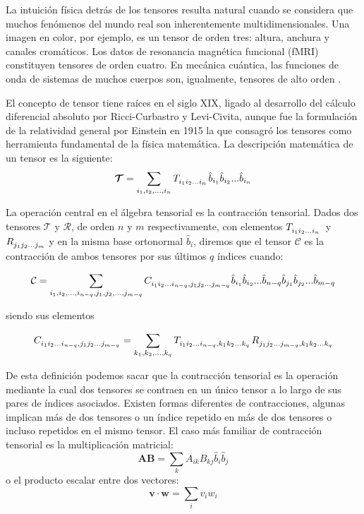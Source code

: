 La intuición física detrás de los tensores resulta natural cuando se considera que muchos fenómenos del mundo real son inherentemente multidimensionales. Una imagen en color, por ejemplo, es un tensor de orden tres: altura, anchura y canales cromáticos. Los datos de resonancia magnética funcional (fMRI) constituyen tensores de orden cuatro. En mecánica cuántica, las funciones de onda de sistemas de muchos cuerpos son, igualmente, tensores de alto orden .

El concepto de tensor tiene raíces en el siglo XIX, ligado al desarrollo del cálculo diferencial absoluto por Ricci-Curbastro y Levi-Civita, aunque fue la formulación de la relatividad general por Einstein en 1915 la que consagró los tensores como herramienta fundamental de la física matemática. La descripción matemática de un tensor es la siguiente:
\begin{equation} \label{eq: 1}
    \boldsymbol{\mathcal{T}} = \sum_{i_1, i_2,..., i_n} \tensor{T}{_{i_1}_{i_2}_{...}_{i_n}} \hat{b}_{i_1} \hat{b}_{i_2}...\hat{b}_{i_n}
\end{equation}

La operación central en el álgebra tensorial es la contracción tensorial. Dados dos tensores $\boldsymbol{\mathcal{T}}$ y $\boldsymbol{\mathcal{R}}$, de orden $n$ y $m$ respectivamente, con elementos $\tensor{T}{_{i_1}_{i_2}_{...}_{i_n}}$ y $\tensor{R}{_{j_1}_{j_2}_{...}_{j_m}}$ y en la misma base ortonormal $\hat{b}_{i}$, diremos que el tensor $\boldsymbol{\mathcal{C}}$ es la contracción de ambos tensores por sus últimos $q$ índices cuando:

\begin{equation} \label{eq: 2}
    \mathcal{C} = \sum_{i_1, i_2,...,i_{n-q},j_1,j_2,...,j_{m-q}} \tensor{C}{_{i_1}_{i_2}_{...}_{i_{n-q}}_{,}_{j_1}_{j_2}_{...}_{j_{m-q}}} \hat{b}_{i_1}\hat{b}_{i_2}...\hat{b}_{n-q}\hat{b}_{j_1}\hat{b}_{j_2}...\hat{b}_{m-q}
\end{equation}

siendo sus elementos

\begin{equation} \label{eq: 3}
    \tensor{C}{_{i_1}_{i_2}_{...}_{i_{n-q}}_{,}_{j_1}_{j_2}_{...}_{j_{m-q}}} = \sum_{k_1, k_2,...,k_{q}} \tensor{T}{_{i_1}_{i_2}_{...}_{i_{n-q}}_{,}_{k_1}_{k_2}_{...}_{k_{q}}} \tensor{R}{_{j_1}_{j_2}_{...}_{j_{m-q}}_{,}_{k_1}_{k_2}_{...}_{k_{q}}}
\end{equation}

De esta definición podemos sacar que la contracción tensorial es la operación mediante la cual dos tensores se contraen en un único tensor a lo largo de sus pares de índices asociados. Existen formas diferentes de contracciones, algunas implican más de dos tensores o un índice repetido en más de dos tensores o incluso repetidos en el mismo tensor. El caso más familiar de contracción tensorial es la multiplicación matricial: \[\mathbf{AB} = \sum_{k} A_{ik}B_{kj}\hat{b}_i\hat{b}_j\] o el producto escalar entre dos vectores: \[\mathbf{v}\cdot\mathbf{w} = \sum_i v_iw_i\]

